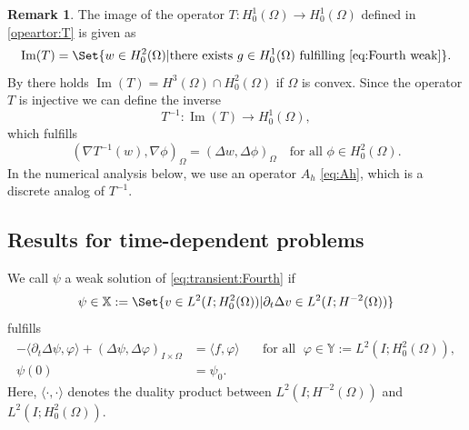 \documentclass{m2an}
\newcommand{\1}{\mathds{1}}
\newcommand{\Om}{\Omega}
\newcommand{\IOm}{I\times \Om}
\newcommand{\Oprod}[1]{\left(#1\right)_{\Omega}}
\newcommand{\XX}{\mathbb{X}}
\newcommand{\YY}{\mathbb{Y}}
\theoremstyle{definition}
\newtheorem{remark}[theorem]{Remark}
\newcommand{\Cref}[1]{\zcref{#1}}
\begin{document}
\begin{remark}
The image of the operator $T \colon H^1_0(\Omega) \to H^1_0(\Omega)$ defined in \eqref{opeartor:T} is given as
\[
\operatorname{Im}(T) = \Set{w \in H^2_0(\Omega) | \text{there exists } g \in H^1_0(\Omega) \text{ fulfilling~\eqref{eq:Fourth weak}}}.
\]
By \Cref{cor:biharmonic} there holds $\operatorname{Im}(T) = H^3(\Omega)\cap H^2_0(\Omega)$ if $\Omega$ is convex. Since the operator $T$ is injective we can define the inverse
\[
T^{-1} \colon \operatorname{Im}(T) \to H^1_0(\Omega),
\]
which fulfills
\[
\Oprod{\nabla T^{-1}(w),\nabla \phi} = \Oprod{\Delta w, \Delta \phi} 
\quad \text{for all } \phi \in H^2_0(\Omega).
\]
In the numerical analysis below, we use an operator $A_h$ \eqref{eq:Ah}, which is a discrete analog of  $T^{-1}$.
\end{remark}


\subsection{Results for time-dependent problems}
We call $\psi$ a weak solution of \eqref{eq:transient:Fourth} if 
\begin{equation}\label{eq:XXdefinition}
\psi \in \XX := \Set{v \in L^2(I;H^2_0(\Omega)) | \partial_t \Delta v \in L^2(I;H^{-2}(\Omega))}
\end{equation}
fulfills
\begin{equation}\label{eq:transient_biharmonic_weak}
    \begin{aligned}
	-\langle\partial_t \Delta \psi, \varphi\rangle+(\Delta \psi, \Delta \varphi)_{\IOm} &= \langle f, \varphi \rangle \quad &\text{for all }\; \varphi\in \YY := L^2(I;H^2_0(\Omega)), \\
	\psi(0) &= \psi_0. &
    \end{aligned}
\end{equation}
Here, $\langle \cdot, \cdot \rangle$ denotes the duality product between $L^2(I;H^{-2}(\Omega))$ 
and $L^2(I;H^2_0(\Omega))$.
\end{document}
